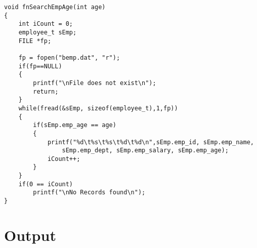 \begin{Verbatim}
void fnSearchEmpAge(int age)
{
	int iCount = 0;
	employee_t sEmp;
	FILE *fp;

	fp = fopen("bemp.dat", "r");
	if(fp==NULL)
	{
	    printf("\nFile does not exist\n");
	    return;
	}
	while(fread(&sEmp, sizeof(employee_t),1,fp))
	{
		if(sEmp.emp_age == age)
		{
			printf("%d\t%s\t%s\t%d\t%d\n",sEmp.emp_id, sEmp.emp_name, 
				sEmp.emp_dept, sEmp.emp_salary, sEmp.emp_age);
			iCount++;
		}
	}
	if(0 == iCount)
		printf("\nNo Records found\n");
}

\end{Verbatim}

\section*{Output}
\begin{Verbatim}



\end{Verbatim}

